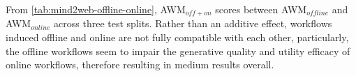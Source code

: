 From \autoref{tab:mind2web-offline-online}, \textsc{AWM$_\mathit{off+on}$} scores between AWM$_\mathit{offline}$ and AWM$_\mathit{online}$ across three test splits. Rather than an additive effect, workflows induced offline and online are not fully compatible with each other, particularly, the offline workflows seem to impair the generative quality and utility efficacy of online workflows, therefore resulting in medium results overall.





